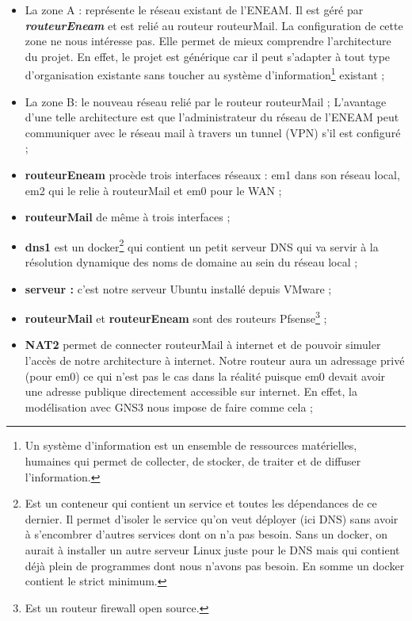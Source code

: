 \documentclass[a4paper,12pt,french]{report} %
\begin{document}
\begin{itemize}
\item La zone A : représente le réseau existant de l'ENEAM. Il est géré par \emph{\textbf{routeurEneam}} et est relié au routeur routeurMail. La configuration de cette zone ne nous intéresse pas. Elle permet de mieux comprendre l'architecture du projet. En effet, le projet est générique car il peut s'adapter à tout type d'organisation existante sans toucher au système d'information\footnote{Un système d'information est un ensemble de ressources matérielles, humaines qui permet de collecter, de stocker, de traiter et de diffuser l'information.} existant ;%
\item La zone B: le nouveau réseau relié par le routeur routeurMail ;
L'avantage d'une telle architecture est que l'administrateur du réseau de l'ENEAM peut communiquer avec le réseau mail à travers un tunnel (VPN) s'il est configuré ;
\item \textbf{routeurEneam} procède trois interfaces réseaux : em1 dans son réseau local, em2 qui le relie à routeurMail et em0 pour le WAN ;
\item \textbf{routeurMail} de même à trois interfaces ;
\item \textbf{dns1} est un docker\footnote{Est un conteneur qui contient un service et toutes les dépendances de ce dernier. Il permet d'isoler le service qu'on veut déployer (ici DNS) sans avoir à s'encombrer d'autres services dont on n'a pas besoin. Sans un docker, on aurait à installer un autre serveur Linux juste pour le DNS mais qui contient déjà plein de programmes dont nous n'avons  pas besoin. En somme un docker contient le strict minimum.} qui contient un petit serveur DNS qui va servir à la résolution dynamique des noms de domaine au sein du réseau local ;
\item \textbf{serveur :} c'est notre serveur Ubuntu installé depuis VMware ;
\item \textbf{routeurMail} et \textbf{routeurEneam} sont des routeurs Pfsense\footnote{Est un routeur firewall open source.} ;
\item \textbf{NAT2} permet de connecter routeurMail à internet et de pouvoir simuler l'accès de notre architecture à internet. Notre routeur aura un adressage privé (pour em0) ce qui n'est pas le cas dans la réalité puisque em0 devait avoir une adresse publique directement accessible sur internet. En effet, la modélisation avec GNS3 nous impose de faire comme cela ;
\end{itemize}
\end{document}
